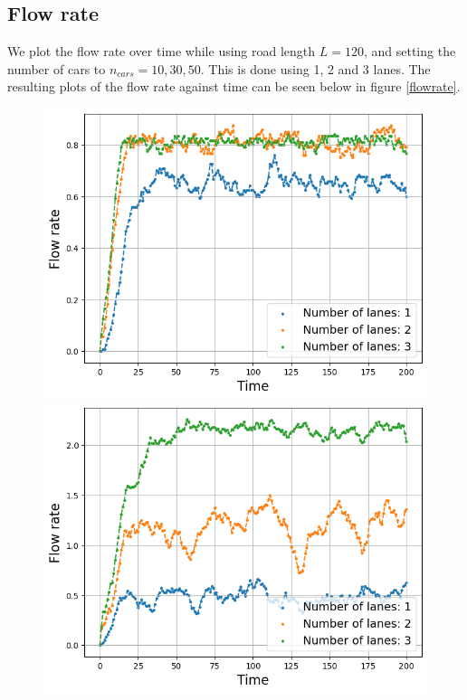 \documentclass[a4paper,12pt]{article}
\begin{document}
\subsection*{Flow rate}
We plot the flow rate over time while using road length $L=120$, and setting the number of cars to $n_{cars}=10, 30, 50$. This is done using 1, 2 and 3 lanes.
The resulting plots of the flow rate against time can be seen below in figure \ref*{flowrate}.
\begin{figure}[H]
    \centering
    \begin{minipage}{.5\textwidth}
        \centering
        \includegraphics[scale=0.47]{Images/flowrate time 10 cars.png}
    \end{minipage}%
    \begin{minipage}{.5\textwidth}
        \centering
        \includegraphics[scale=0.47]{Images/flowrate time 30 cars.png}

\end{minipage}
\end{figure}
\end{document}
